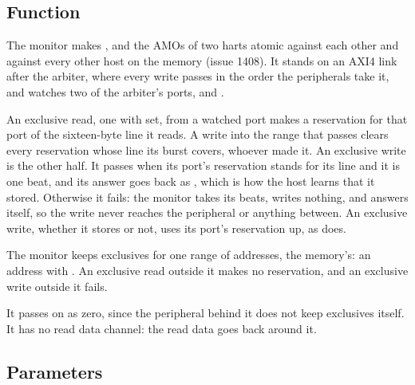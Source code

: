 
%
{}%
{}

\subsection*{Function}

The monitor makes ,  and the AMOs of two harts
atomic against each other and against every other host on the memory
(issue 1408). It stands on an AXI4 link after the arbiter, where every
write passes in the order the peripherals take it, and watches two of
the arbiter's ports,  and .

An exclusive read, one with  set, from a watched port makes
a reservation for that port of the sixteen-byte line it reads. A write
into the range that passes clears every reservation whose line its
burst covers, whoever made it. An exclusive write is the other half.
It passes when its port's reservation stands for its line and it is
one beat, and its answer goes back as , which is how the
host learns that it stored. Otherwise it fails: the monitor takes its
beats, writes nothing, and answers  itself, so the write
never reaches the peripheral or anything between. An exclusive write,
whether it stores or not, uses its port's reservation up, as  does.

The monitor keeps exclusives for one range of addresses, the memory's:
an address  with . An exclusive read
outside it makes no reservation, and an exclusive write outside it
fails.

It passes  on as zero, since the peripheral behind it does
not keep exclusives itself. It has no read data channel: the read data
goes back around it.

\subsection*{Parameters}

